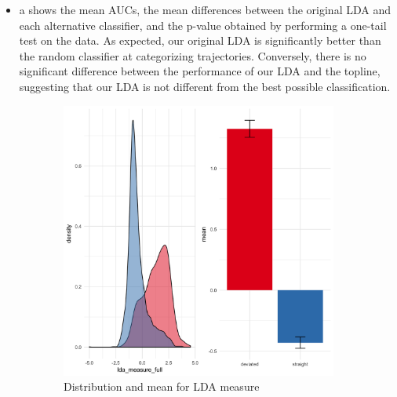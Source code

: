 \documentclass{article}
\begin{document}
\begin{itemize}
\item {}a shows the mean AUCs, the mean differences between the original LDA and each alternative classifier, and the p-value obtained by performing a one-tail test on the data. As expected, our original LDA is significantly better than the random classifier at categorizing trajectories. Conversely, there is no significant difference between the performance of our LDA and the topline, suggesting that our LDA is not different from the best possible classification. 

\end{itemize}

\begin{figure}
\begin{subfigure}[b]{0.55\textwidth}
\includegraphics[width=\textwidth]{LDA-Distribution.png}
\caption{Distribution and mean for LDA measure}\label{DIST:LDA}
\end{subfigure}
%
\begin{subfigure}[b]{0.35\textwidth}

\end{subfigure}
\end{figure}
\end{document}
